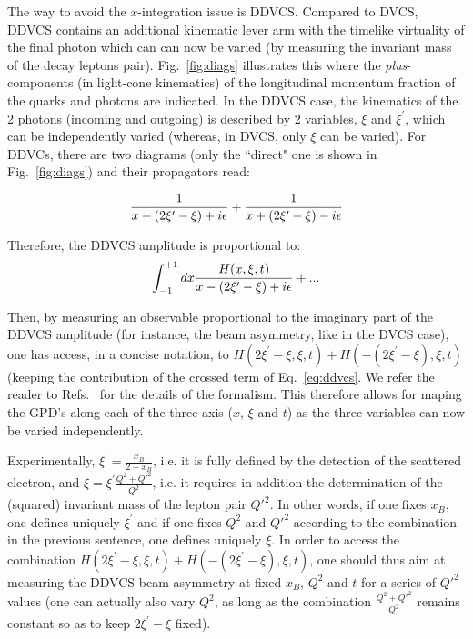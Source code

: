The way to avoid the $x$-integration issue is DDVCS. Compared to DVCS,
DDVCS contains an additional kinematic lever arm with the timelike virtuality of the
final photon which can can now be varied (by measuring the invariant mass of the
decay leptons pair).
Fig.~\ref{fig:diags} illustrates this where the {\it plus}-components 
(in light-cone kinematics) of
the longitudinal momentum fraction of the quarks and photons are
indicated. In the DDVCS case, the kinematics of the 2 photons 
(incoming and outgoing) is described by 2 variables, $\xi$ and 
$\xi^\prime$, which can be independently varied (whereas, in DVCS,
only $\xi$ can be varied). For DDVCs, there are two diagrams
(only the ``direct" one is shown in Fig.~\ref{fig:diags}) and
their propagators read:

\begin{equation}
{1 \over {x - (2\xi^\prime-\xi) + i \epsilon}} + 
{1 \over {x + (2\xi^\prime-\xi) - i \epsilon}}
\label{eq:ddvcs}
\end{equation}

Therefore, the DDVCS amplitude is proportional to: 
\begin{equation}
\int_{-1}^{+1}d x {{H(x,\xi,t)} \over {x - (2\xi^\prime-\xi) + i \epsilon}}+...
\label{eq:ddvcs2}
\end{equation}

Then, by measuring an observable proportional to the imaginary part of the 
DDVCS amplitude (for instance, the beam asymmetry, like in the DVCS case),
one has access, in a concise notation, to $H(2\xi^\prime-\xi,\xi,t)
+H(-(2\xi^\prime-\xi),\xi,t)$ (keeping the contribution of the crossed term
of Eq.~\ref{eq:ddvcs}.
We refer the reader to Refs.~\cite{Guidal:2002kt,ddvcs_bm1,ddvcs_bm2} 
for the details of the formalism. This therefore allows for maping the GPD's along each
of the three axis ($x$, $\xi$ and $t$) as the three variables can now 
be varied independently. 

Experimentally, $\xi^\prime=\frac{x_B}{2-x_B}$,
i.e. it is fully defined by the detection of the scattered electron,
and $\xi=\xi^\prime\frac{Q^2+Q'^2}{Q^2}$, i.e. it requires 
in addition the determination of the (squared) invariant mass of the lepton
pair $Q'^2$. In other words, if one fixes $x_B$, one defines uniquely $\xi^\prime$
and if one fixes $Q^2$ and $Q'^2$ according to the combination in the
previous sentence, one defines uniquely $\xi$. In order
to access the combination $H(2\xi^\prime-\xi,\xi,t)+H(-(2\xi^\prime-\xi),\xi,t)$,
one should thus aim at measuring the DDVCS beam asymmetry at fixed $x_B$,
$Q^2$ and $t$ for a series of $Q'^2$ values (one can actually also vary $Q^2$,
as long as the combination $\frac{Q^2+Q'^2}{Q^2}$ remains constant
so as to keep $2\xi^\prime-\xi$ fixed).

